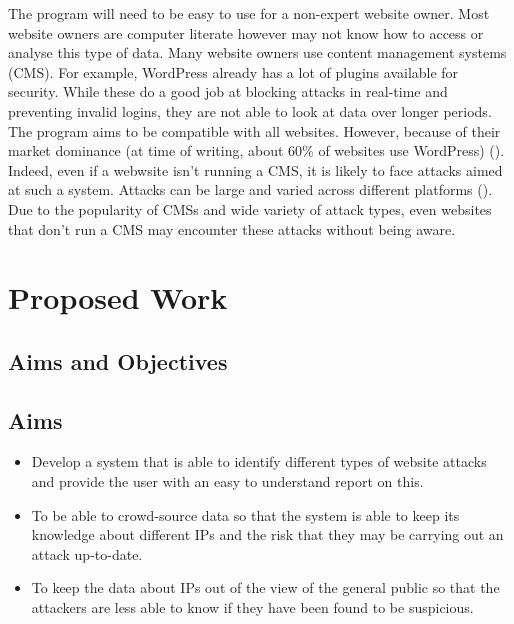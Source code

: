 The program will need to be easy to use for a non-expert website owner. Most website owners are computer literate however may not know how to access or analyse this type of data. Many website owners use content management systems (CMS). For example, WordPress already has a lot of plugins available for security. While these do a good job at blocking attacks in real-time and preventing invalid logins, they are not able to look at data over longer periods. The program aims to be compatible with all websites. However, because of their market dominance (at time of writing, about 60\% of websites use WordPress)  (\cite{IsItWP}). Indeed, even if a webwsite isn't running a CMS, it is likely to face attacks aimed at such a system. Attacks can be large and varied across different platforms (\cite{patel2013comparative}). Due to the popularity of CMSs and wide variety of attack types, even websites that don't run a CMS may encounter these attacks without being aware.
\section{Proposed Work}
\label{proposed}


\subsection*{Aims and Objectives}
\subsection*{Aims}
\begin{itemize}
    \item Develop a system that is able to identify different types of website attacks and provide the user with an easy to understand report on this.
    \item To be able to crowd-source data so that the system is able to keep its knowledge about different IPs and the risk that they may be carrying out an attack up-to-date.
    \item To keep the data about IPs out of the view of the general public so that the attackers are less able to know if they have been found to be suspicious.
\end{itemize}

